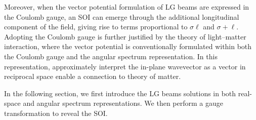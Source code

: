 Moreover, when the vector potential formulation of LG beams are expressed in the Coulomb gauge, an SOI can emerge through the additional longitudinal component of the field, giving rise to terms proportional to $\sigma \ell$ and $\sigma + \ell$. Adopting the Coulomb gauge is further justified by the theory of light–matter interaction, where the vector potential is conventionally formulated within both the Coulomb gauge and the angular spectrum representation. In this representation, approximately interpret the in-plane wavevector as a vector in reciprocal space enable a connection to theory of matter.

In the following section, we first introduce the LG beams solutions in both real-space and angular spectrum representations. We then perform a gauge transformation to reveal the SOI.

